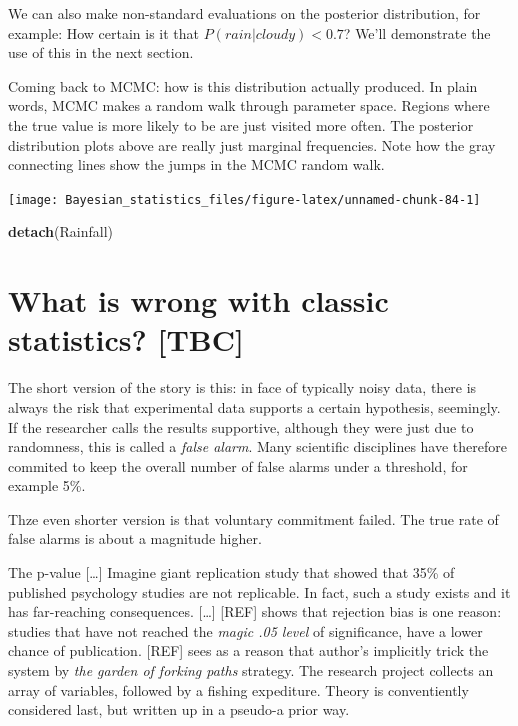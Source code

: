 \documentclass[]{svmono}
\newenvironment{Shaded}{\begin{snugshade}}{\end{snugshade}}
\newcommand{\KeywordTok}[1]{\textcolor[rgb]{0.13,0.29,0.53}{\textbf{#1}}}
\newcommand{\NormalTok}[1]{#1}
\begin{document}
We can also make non-standard evaluations on the posterior distribution,
for example: How certain is it that \(P(rain|cloudy) < 0.7\)? We'll
demonstrate the use of this in the next section.

Coming back to MCMC: how is this distribution actually produced. In
plain words, MCMC makes a random walk through parameter space. Regions
where the true value is more likely to be are just visited more often.
The posterior distribution plots above are really just marginal
frequencies. Note how the gray connecting lines show the jumps in the
MCMC random walk.

\texttt{[image: Bayesian\_statistics\_files/figure-latex/unnamed-chunk-84-1]}

\begin{Shaded}
\begin{Highlighting}[]
\KeywordTok{detach}\NormalTok{(Rainfall)}
\end{Highlighting}
\end{Shaded}

\section{What is wrong with classic statistics?
{[}TBC{]}}\label{what-is-wrong-with-classic-statistics-tbc}

The short version of the story is this: in face of typically noisy data,
there is always the risk that experimental data supports a certain
hypothesis, seemingly. If the researcher calls the results supportive,
although they were just due to randomness, this is called a \emph{false
alarm}. Many scientific disciplines have therefore commited to keep the
overall number of false alarms under a threshold, for example 5\%.

Thze even shorter version is that voluntary commitment failed. The true
rate of false alarms is about a magnitude higher.

The p-value {[}\ldots{}{]} Imagine giant replication study that showed
that 35\% of published psychology studies are not replicable. In fact,
such a study exists and it has far-reaching consequences. {[}\ldots{}{]}
{[}REF{]} shows that rejection bias is one reason: studies that have not
reached the \emph{magic .05 level} of significance, have a lower chance
of publication. {[}REF{]} sees as a reason that author's implicitly
trick the system by \emph{the garden of forking paths} strategy. The
research project collects an array of variables, followed by a fishing
expediture. Theory is conventiently considered last, but written up in a
pseudo-a prior way.
\end{document}
